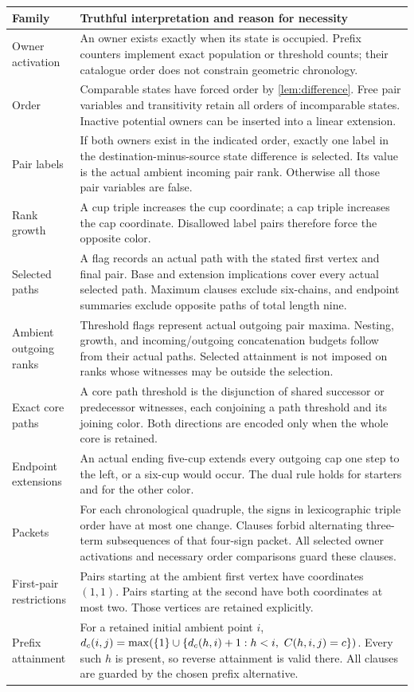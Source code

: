 \begin{longtable}{>{\raggedright\arraybackslash}p{}>{\raggedright\arraybackslash}p{}}
\toprule
Family & Truthful interpretation and reason for necessity\\
\midrule\endhead
Owner activation & An owner exists exactly when its state is occupied.
Prefix counters implement exact population or threshold counts;
their catalogue order does not constrain geometric chronology.\\[5pt]
Order & Comparable states have forced order by \cref{lem:difference}.
Free pair variables and transitivity retain all orders of incomparable
states. Inactive potential owners can be inserted into a linear extension.\\[5pt]
Pair labels & If both owners exist in the indicated order, exactly one
label in the destination-minus-source state difference is selected.
Its value is the actual ambient incoming pair rank. Otherwise all
those pair variables are false.\\[5pt]
Rank growth & A cup triple increases the cup coordinate; a cap triple
increases the cap coordinate. Disallowed label pairs therefore force
the opposite color.\\[5pt]
Selected paths & A flag records an actual path with the stated first
vertex and final pair. Base and extension implications cover every
actual selected path. Maximum clauses exclude six-chains, and endpoint
summaries exclude opposite paths of total length nine.\\[5pt]
Ambient outgoing ranks & Threshold flags represent actual outgoing
pair maxima. Nesting, growth, and incoming/outgoing concatenation
budgets follow from their actual paths. Selected attainment is not
imposed on ranks whose witnesses may be outside the selection.\\[5pt]
Exact core paths & A core path threshold is the disjunction of shared
successor or predecessor witnesses, each conjoining a path threshold
and its joining color. Both directions are encoded only when the
whole core is retained.\\[5pt]
Endpoint extensions & An actual ending five-cup extends every outgoing
cap one step to the left, or a six-cup would occur. The dual rule
holds for starters and for the other color.\\[5pt]
Packets & For each chronological quadruple, the signs in lexicographic
triple order have at most one change. Clauses forbid alternating
three-term subsequences of that four-sign packet. All selected owner
activations and necessary order comparisons guard these clauses.\\[5pt]
First-pair restrictions & Pairs starting at the ambient first vertex
have coordinates $(1,1)$. Pairs starting at the second have both
coordinates at most two. Those vertices are retained explicitly.\\[5pt]
Prefix attainment & For a retained initial ambient point $i$,
$d_c(i,j)=\max(\set1\cup\set{d_c(h,i)+1:h<i,\ C(h,i,j)=c})$.
Every such $h$ is present, so reverse attainment is valid there.
All clauses are guarded by the chosen prefix alternative.\\
\bottomrule
\end{longtable}

